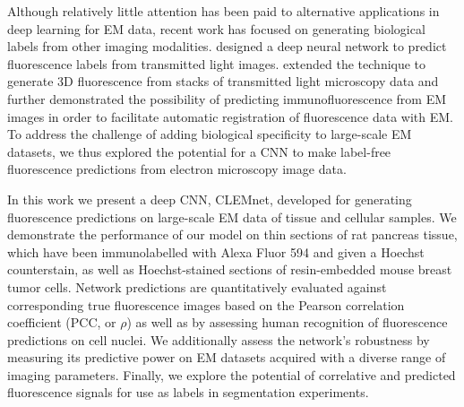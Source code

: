 Although relatively little attention has been paid to alternative applications in deep learning for EM data, recent work has focused on generating biological labels from other imaging modalities. \textcite{christiansen2018silico} designed a deep neural network to predict fluorescence labels from transmitted light images. \textcite{ounkomol2018label} extended the technique to generate 3D fluorescence from stacks of transmitted light microscopy data and further demonstrated the possibility of predicting immunofluorescence from EM images in order to facilitate automatic registration of fluorescence data with EM. To address the challenge of adding biological specificity to large-scale EM datasets, we thus explored the potential for a CNN to make label-free fluorescence predictions from electron microscopy image data.

In this work we present a deep CNN, CLEMnet, developed for generating fluorescence predictions on large-scale EM data of tissue and cellular samples. We demonstrate the performance of our model on thin sections of rat pancreas tissue, which have been immunolabelled with Alexa Fluor 594 and given a Hoechst counterstain, as well as Hoechst-stained sections of resin-embedded mouse breast tumor cells. Network predictions are quantitatively evaluated against corresponding true fluorescence images based on the Pearson correlation coefficient (PCC, or $\rho$) as well as by assessing human recognition of fluorescence predictions on cell nuclei. We additionally assess the network's robustness by measuring its predictive power on EM datasets acquired with a diverse range of imaging parameters. Finally, we explore the potential of correlative and predicted fluorescence signals for use as labels in segmentation experiments.
